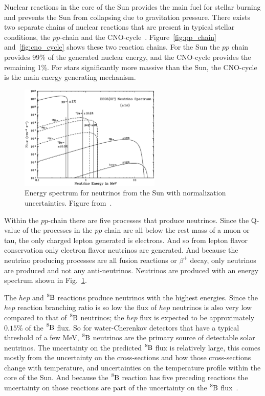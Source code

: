 Nuclear reactions in the core of the Sun provides the main fuel for
stellar burning and prevents the Sun from collapsing due to gravitation
pressure.
There exists two separate chains of nuclear reactions that are present in typical
stellar conditions, the $pp$-chain and the CNO-cycle~\citep{bahcall_solar_neutrinos_theory}.
Figure~\ref{fig:pp_chain} and~\ref{fig:cno_cycle} shows these two reaction chains.
For the Sun the $pp$ chain
provides 99\% of the generated nuclear energy, and the CNO-cycle provides the remaining
1\%. For stars significantly more massive than the Sun, the CNO-cycle is the
main energy generating mechanism.

\begin{figure}[htbp]
\centering
\includegraphics[width=0.6\textwidth]{bs05op_spectrum}
\caption[Solar Neutrino Spectrum]{Energy spectrum for neutrinos from
the Sun with normalization uncertainties. Figure from~\citep{bs_ssm}.}
\label{fig:bs05_spectrum}
\end{figure}

Within the $pp$-chain there are five processes that produce neutrinos.
Since the Q-value of the processes in the $pp$ chain are all below the rest mass
of a muon or tau, the only charged lepton generated is electrons. And so from
lepton flavor conservation only electron flavor neutrinos are generated.
And because the neutrino producing processes are all fusion reactions or
$\beta^{+}$ decay, only neutrinos are produced and not any anti-neutrinos.
Neutrinos are produced with an energy spectrum shown in Fig.~\ref{fig:bs05_spectrum}.

The $hep$ and $\ce{^{8}B}$ reactions produce neutrinos with the highest
energies. Since the $hep$ reaction branching ratio is so low the flux
of $hep$ neutrinos is also very low compared to that of $\ce{^{8}B}$ neutrinos;
the $hep$ flux is expected to be approximately $0.15\%$ of the $\ce{^{8}B}$ flux.
So for water-Cherenkov detectors that have a typical threshold of a few MeV,
$\ce{^{8}B}$ neutrinos are the primary source of detectable solar neutrinos.
The uncertainty on the predicted $\ce{^{8}B}$ flux is relatively large, this comes mostly
from the uncertainty on the cross-sections and how those cross-sections change with
temperature, and uncertainties on the temperature profile within the core of the Sun.
And because the $\ce{^{8}B}$ reaction has five preceding reactions the uncertainty on
 those reactions are part of the uncertainty on the $\ce{^{8}B}$ flux~\citep{bs_ssm}.

